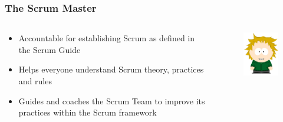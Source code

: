 \begin{frame}
	\frametitle{The Scrum Master}
				
	\begin{columns}
		\begin{column}{0.7\textwidth}
			\begin{itemize}
				\setlength\itemsep{0.7em}
				\item Accountable for establishing Scrum as defined in the Scrum Guide
				\item Helps everyone understand Scrum theory, practices and rules
				\item Guides and coaches the Scrum Team to improve its practices within the Scrum framework
			\end{itemize}
		\end{column}
		\begin{column}{0.3\textwidth}
			\vspace{-2em}
			\begin{figure}
				\includegraphics[width=1.6in]{images/sm.jpg}\\
			\end{figure}
		\end{column}
	\end{columns}
\end{frame}

